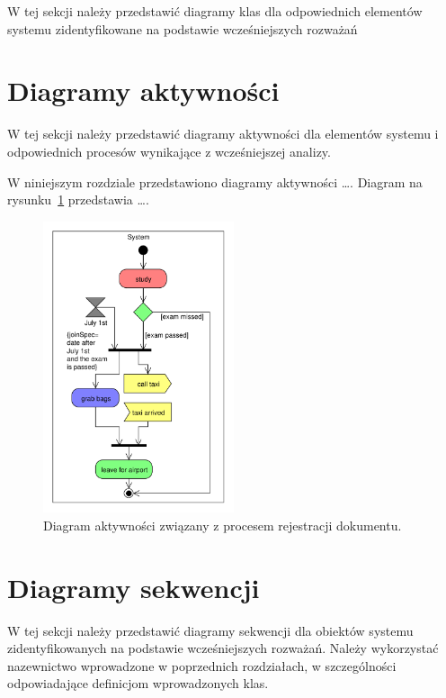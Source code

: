 W tej sekcji należy przedstawić diagramy klas dla odpowiednich elementów systemu zidentyfikowane na podstawie wcześniejszych rozważań 

\section{Diagramy aktywności}

W tej sekcji należy przedstawić diagramy aktywności dla elementów systemu i odpowiednich procesów wynikające z wcześniejszej analizy.  

{\color{dgray}
W niniejszym rozdziale przedstawiono diagramy aktywności \ldots. Diagram na rysunku~\ref{czynnosci_GD} przedstawia \ldots.
} 

\begin{figure}[h!]
\begin{center}
\includegraphics[width=0.5\textwidth]{aktyw.pdf}
\end{center}
\caption{{\color{dgray}Diagram aktywności związany z procesem rejestracji dokumentu.}} \label{czynnosci_GD}
\end{figure}  

\section{Diagramy sekwencji}

W tej sekcji należy przedstawić diagramy sekwencji dla obiektów systemu zidentyfikowanych na podstawie wcześniejszych rozważań. Należy wykorzystać nazewnictwo wprowadzone w poprzednich rozdziałach, w szczególności odpowiadające definicjom wprowadzonych klas.

